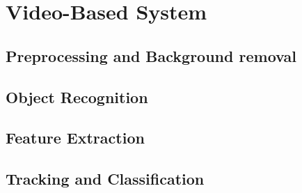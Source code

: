 \chapter{Video-Based System}

\section{Preprocessing and Background removal}
\section{Object Recognition}
\section{Feature Extraction}
\section{Tracking and Classification}